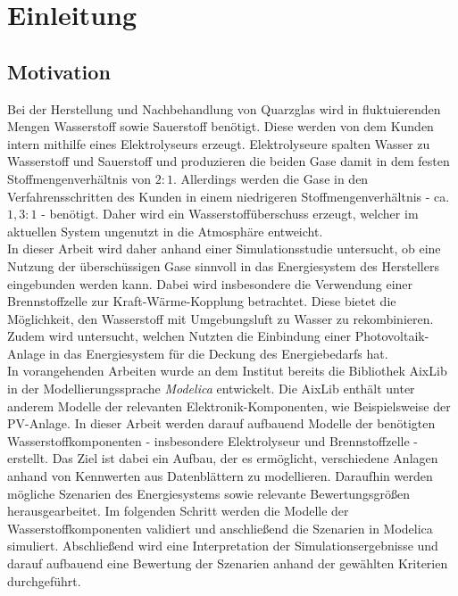 \chapter{Einleitung}
\label{cha:Einleitung}
\section{Motivation}
Bei der Herstellung und Nachbehandlung von Quarzglas wird in fluktuierenden Mengen Wasserstoff sowie Sauerstoff benötigt. Diese werden von dem Kunden intern mithilfe eines Elektrolyseurs erzeugt. Elektrolyseure spalten Wasser zu Wasserstoff und Sauerstoff und produzieren die beiden Gase damit in dem festen Stoffmengenverhältnis von $2:1$.
Allerdings werden die Gase in den Verfahrensschritten des Kunden in einem niedrigeren Stoffmengenverhältnis - ca. $1,3:1$ - benötigt. Daher wird ein Wasserstoffüberschuss erzeugt, welcher im aktuellen System ungenutzt in die Atmosphäre entweicht.\\
In dieser Arbeit wird daher anhand einer Simulationsstudie untersucht, ob eine Nutzung der überschüssigen Gase sinnvoll in das Energiesystem des Herstellers eingebunden werden kann. Dabei wird insbesondere die Verwendung einer Brennstoffzelle zur Kraft-Wärme-Kopplung betrachtet. Diese bietet die Möglichkeit, den Wasserstoff mit Umgebungsluft zu Wasser zu rekombinieren.\\
Zudem wird untersucht, welchen Nutzten die Einbindung einer Photovoltaik-Anlage in das Energiesystem für die Deckung des Energiebedarfs hat.\\

In vorangehenden Arbeiten wurde an dem Institut bereits die Bibliothek AixLib in der Modellierungssprache \textit{Modelica} entwickelt. Die AixLib enthält unter anderem Modelle der relevanten Elektronik-Komponenten, wie Beispielsweise der PV-Anlage. In dieser Arbeit werden darauf aufbauend Modelle der benötigten Wasserstoffkomponenten - insbesondere Elektrolyseur und Brennstoffzelle - erstellt. Das Ziel ist dabei ein Aufbau, der es ermöglicht, verschiedene Anlagen anhand von Kennwerten aus Datenblättern zu modellieren. Daraufhin werden mögliche Szenarien des Energiesystems sowie relevante Bewertungsgrößen herausgearbeitet. Im folgenden Schritt werden die Modelle der Wasserstoffkomponenten validiert und anschließend die Szenarien in Modelica simuliert. Abschließend wird eine Interpretation der Simulationsergebnisse und darauf aufbauend eine Bewertung der Szenarien anhand der gewählten Kriterien durchgeführt.\\

